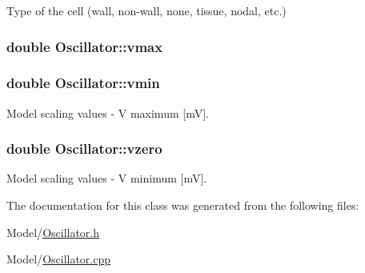 Type of the cell (wall, non-\/wall, none, tissue, nodal, etc.) 

\hypertarget{class_oscillator_a43006eaf9a5a3b50a8f6a2a95ce47231}{
\subsubsection[{vmax}]{\setlength{\rightskip}{0pt plus 5cm}double Oscillator\+::vmax}}\label{class_oscillator_a43006eaf9a5a3b50a8f6a2a95ce47231}
\hypertarget{class_oscillator_a8912b5faff383dcc1a33554d2bcc5844}{
\subsubsection[{vmin}]{\setlength{\rightskip}{0pt plus 5cm}double Oscillator\+::vmin}}\label{class_oscillator_a8912b5faff383dcc1a33554d2bcc5844}


Model scaling values -\/ V maximum \mbox{[}m\+V\mbox{]}. 

\hypertarget{class_oscillator_af6886099dfca8ec732676f4f89935651}{
\subsubsection[{vzero}]{\setlength{\rightskip}{0pt plus 5cm}double Oscillator\+::vzero}}\label{class_oscillator_af6886099dfca8ec732676f4f89935651}


Model scaling values -\/ V minimum \mbox{[}m\+V\mbox{]}. 



The documentation for this class was generated from the following files\+:\begin{DoxyCompactItemize}
\item 
Model/\hyperlink{_oscillator_8h}{Oscillator.\+h}\item 
Model/\hyperlink{_oscillator_8cpp}{Oscillator.\+cpp}\end{DoxyCompactItemize}
